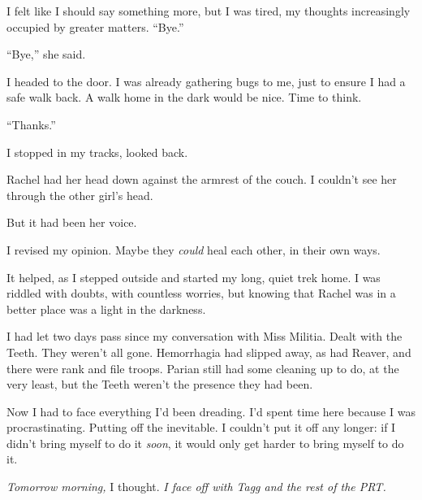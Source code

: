 I felt like I should say something more, but I was tired, my thoughts increasingly occupied by greater matters.  ``Bye.''



``Bye,'' she said.



I headed to the door.  I was already gathering bugs to me, just to ensure I had a safe walk back.  A walk home in the dark would be nice.  Time to think.



``Thanks.''



I stopped in my tracks, looked back.



Rachel had her head down against the armrest of the couch.  I couldn't see her through the other girl's head.



But it had been her voice.



I revised my opinion.  Maybe they \emph{could} heal each other, in their own ways.



It helped, as I stepped outside and started my long, quiet trek home.  I was riddled with doubts, with countless worries, but knowing that Rachel was in a better place was a light in the darkness.



I had let two days pass since my conversation with Miss Militia.  Dealt with the Teeth.  They weren't all gone.  Hemorrhagia had slipped away, as had Reaver, and there were rank and file troops.  Parian still had some cleaning up to do, at the very least, but the Teeth weren't the presence they had been.



Now I had to face everything I'd been dreading.  I'd spent time here because I was procrastinating.  Putting off the inevitable.  I couldn't put it off any longer: if I didn't bring myself to do it \emph{soon}, it would only get harder to bring myself to do it.



\emph{Tomorrow morning, }I thought.\emph{  I face off with Tagg and the rest of the PRT.}





